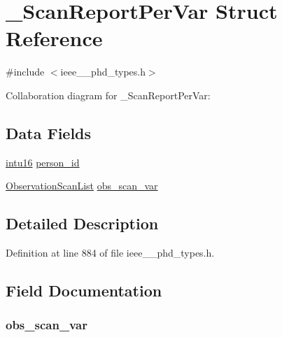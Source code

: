 \hypertarget{struct___scan_report_per_var}{}\section{\+\_\+\+Scan\+Report\+Per\+Var Struct Reference}
\label{struct___scan_report_per_var}


{\ttfamily \#include $<$ieee\+\_\+\_\+phd\+\_\+types.\+h$>$}



Collaboration diagram for \+\_\+\+Scan\+Report\+Per\+Var\+:
\subsection*{Data Fields}
\begin{DoxyCompactItemize}
\item 
\hyperlink{ieee__11073__phd__types_8h_a3561595d2aa7416532e1c9910abd076d}{intu16} \hyperlink{struct___scan_report_per_var_a508e6969c9e1531b94e99ea24031d53b}{person\+\_\+id}
\item 
\hyperlink{ieee__11073__phd__types_8h_a2ef4f8e0afe1044aa0577cb42d57463c}{Observation\+Scan\+List} \hyperlink{struct___scan_report_per_var_a6d5c6c418b113f9a497af2f629f77440}{obs\+\_\+scan\+\_\+var}
\end{DoxyCompactItemize}


\subsection{Detailed Description}


Definition at line 884 of file ieee\+\_\+\_\+phd\+\_\+types.\+h.



\subsection{Field Documentation}
\hypertarget{struct___scan_report_per_var_a6d5c6c418b113f9a497af2f629f77440}{}
\subsubsection[{obs\+\_\+scan\+\_\+var}]{ obs\+\_\+scan\+\_\+var}\label{struct___scan_report_per_var_a6d5c6c418b113f9a497af2f629f77440}


